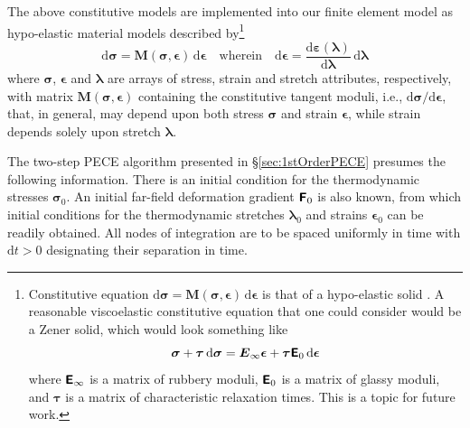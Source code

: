 The above constitutive models are implemented into our finite element model as hypo-elastic material models \cite{Truesdell55} described by\footnote{
    Constitutive equation $\mathrm{d} \boldsymbol{\sigma} = \mathbf{M} ( \boldsymbol{\sigma}, \boldsymbol{\epsilon} ) \, \mathrm{d} \boldsymbol{\epsilon}$ is that of a hypo-elastic solid \cite{Truesdell55}.  A reasonable visco\-elastic constitutive equation that one could consider would be a Zener \cite{Zener48} solid, which would look something like
    $$ \boldsymbol{\sigma} + \boldsymbol{\tau} \, \mathrm{d} \boldsymbol{\sigma} = \boldsymbol{E}_{\infty} \boldsymbol{\epsilon} + \boldsymbol{\tau} \boldsymbol{\mathsf{E}}_0 \, \mathrm{d} \boldsymbol{\epsilon} $$ 
    where $\boldsymbol{\mathsf{E}}_{\infty}$ is a matrix of rubbery moduli, $\boldsymbol{\mathsf{E}}_0$ is a matrix of glassy moduli, and $\boldsymbol{\tau}$ is a matrix of characteristic relaxation times.  This is a topic for future work.
}
\begin{equation}
\mathrm{d} \boldsymbol{\sigma} = \mathbf{M} ( \boldsymbol{\sigma}, \boldsymbol{\epsilon} ) \, \mathrm{d} \boldsymbol{\epsilon} 
\quad \text{wherein} \quad
\mathrm{d} \boldsymbol{\epsilon} = 
\frac{\mathrm{d} \boldsymbol{\varepsilon} ( \boldsymbol{\lambda} )}
{\mathrm{d} \boldsymbol{\lambda}} \, \mathrm{d} \boldsymbol{\lambda}
\label{hypoelastic}
\end{equation}
where $\boldsymbol{\sigma}$, $\boldsymbol{\epsilon}$ and $\boldsymbol{\lambda}$ are arrays of stress, strain and stretch attributes, respectively, with matrix $\mathbf{M} ( \boldsymbol{\sigma}, \boldsymbol{\epsilon} )$ containing the constitutive tangent moduli, i.e., $\mathrm{d} \boldsymbol{\sigma} / \mathrm{d} \boldsymbol{\epsilon}$, that, in general, may depend upon both stress $\boldsymbol{\sigma}$ and strain $\boldsymbol{\epsilon}$, while strain depends solely upon stretch $\boldsymbol{\lambda}$.

The two-step PECE algorithm presented in \S\ref{sec:1stOrderPECE} presumes the following information.  There is an initial condition for the thermo\-dynamic stresses $\boldsymbol{\sigma}_0$.  An initial far-field deformation gradient $\boldsymbol{\mathsf{F}}_0$ is also known, from which initial conditions for the thermo\-dynamic stretches $\boldsymbol{\lambda}_0$ and strains $\boldsymbol{\epsilon}_0$ can be readily obtained.  All nodes of integration are to be spaced uniformly in time with $\mathrm{d}t > 0$ designating their separation in time.  


